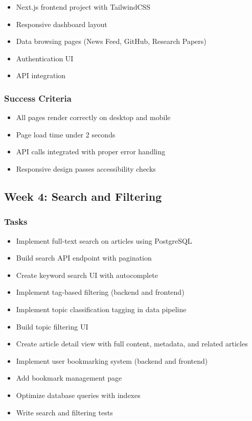 \documentclass[12pt,oneside]{report}
\begin{document}
\begin{itemize}
    \item Next.js frontend project with TailwindCSS
    \item Responsive dashboard layout
    \item Data browsing pages (News Feed, GitHub, Research Papers)
    \item Authentication UI
    \item API integration
\end{itemize}

\subsubsection{Success Criteria}

\begin{itemize}
    \item All pages render correctly on desktop and mobile
    \item Page load time under 2 seconds
    \item API calls integrated with proper error handling
    \item Responsive design passes accessibility checks
\end{itemize}

\subsection{Week 4: Search and Filtering}

\subsubsection{Tasks}

\begin{itemize}
    \item Implement full-text search on articles using PostgreSQL
    \item Build search API endpoint with pagination
    \item Create keyword search UI with autocomplete
    \item Implement tag-based filtering (backend and frontend)
    \item Implement topic classification tagging in data pipeline
    \item Build topic filtering UI
    \item Create article detail view with full content, metadata, and related articles
    \item Implement user bookmarking system (backend and frontend)
    \item Add bookmark management page
    \item Optimize database queries with indexes
    \item Write search and filtering tests
\end{itemize}
\end{document}
